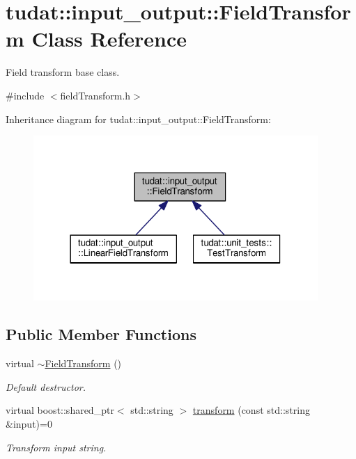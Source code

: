 \hypertarget{classtudat_1_1input__output_1_1FieldTransform}{}\section{tudat\+:\+:input\+\_\+output\+:\+:Field\+Transform Class Reference}
\label{classtudat_1_1input__output_1_1FieldTransform}


Field transform base class.  




{\ttfamily \#include $<$field\+Transform.\+h$>$}



Inheritance diagram for tudat\+:\+:input\+\_\+output\+:\+:Field\+Transform\+:
\nopagebreak
\begin{figure}[H]
\begin{center}
\leavevmode
\includegraphics[width=306pt]{classtudat_1_1input__output_1_1FieldTransform__inherit__graph}
\end{center}
\end{figure}
\subsection*{Public Member Functions}
\begin{DoxyCompactItemize}
\item 
virtual \hyperlink{classtudat_1_1input__output_1_1FieldTransform_af96f02794dd22ee9db116bb83f81f0a9}{$\sim$\+Field\+Transform} ()\hypertarget{classtudat_1_1input__output_1_1FieldTransform_af96f02794dd22ee9db116bb83f81f0a9}{}\label{classtudat_1_1input__output_1_1FieldTransform_af96f02794dd22ee9db116bb83f81f0a9}

\begin{DoxyCompactList}\small\item\em Default destructor. \end{DoxyCompactList}\item 
virtual boost\+::shared\+\_\+ptr$<$ std\+::string $>$ \hyperlink{classtudat_1_1input__output_1_1FieldTransform_ab4be93a414fa1175cbc518fffe3b912a}{transform} (const std\+::string \&input)=0
\begin{DoxyCompactList}\small\item\em Transform input string. \end{DoxyCompactList}\end{DoxyCompactItemize}


